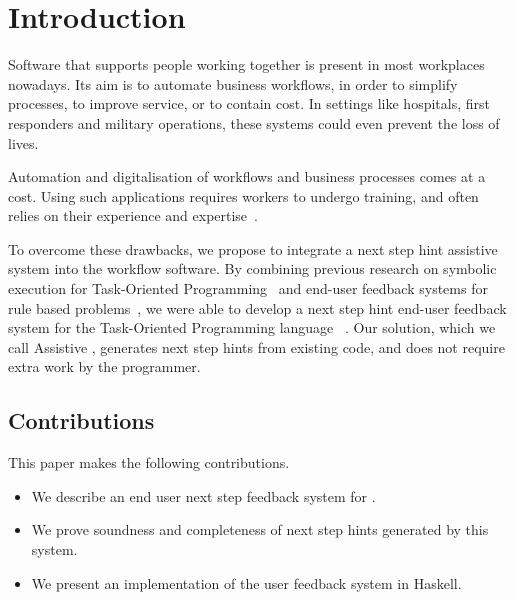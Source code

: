 
\section{Introduction}
\label{sec:intro}

Software that supports people working together is present in most workplaces nowadays.
Its aim is to automate business workflows, in order to simplify processes, to improve service, or to contain cost.
In settings like hospitals, first responders and military operations, these systems could even prevent the loss of lives.


Automation and digitalisation of workflows and business processes comes at a cost.
Using such applications requires workers to undergo training, and often relies on their experience and expertise~\cite{}.

To overcome these drawbacks, we propose to integrate a next step hint assistive system into the workflow software.
By combining previous research on symbolic execution for Task-Oriented Programming~\cite{Naus2019} and end-user feedback systems for rule based problems~\cite{DBLP:conf/sfp/NausJ16},
we were able to develop a next step hint end-user feedback system for the Task-Oriented Programming language \TOPHAT~\cite{DBLP:conf/ppdp/SteenvoordenNK19}.
Our solution, which we call Assistive \TOPHAT, generates next step hints from existing code, and does not require extra work by the programmer.


\subsection{Contributions}

This paper makes the following contributions.

\begin{itemize}
  \item We describe an end user next step feedback system for \TOPHAT.
  \item We prove soundness and completeness of next step hints generated by this system.
  \item We present an implementation of the user feedback system in Haskell.
\end{itemize}


